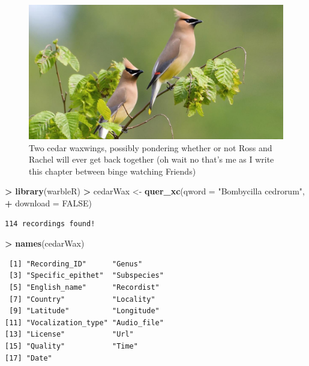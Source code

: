 \documentclass[]{krantz}
\makeatletter
\newenvironment{Shaded}{\begin{snugshade}}{\end{snugshade}}
\newcommand{\KeywordTok}[1]{\textcolor[rgb]{0.27,0.27,0.27}{\textbf{#1}}}
\newcommand{\DataTypeTok}[1]{\textcolor[rgb]{0.27,0.27,0.27}{#1}}
\newcommand{\StringTok}[1]{\textcolor[rgb]{0.5,0.5,0.5}{#1}}
\newcommand{\OtherTok}[1]{\textcolor[rgb]{0.37,0.37,0.37}{#1}}
\newcommand{\OperatorTok}[1]{\textcolor[rgb]{0.43,0.43,0.43}{\textbf{#1}}}
\newcommand{\NormalTok}[1]{#1}
\newenvironment{kframe}{%
\medskip{}
\setlength{\fboxsep}{.8em}
 \def\at@end@of@kframe{}%
 \ifinner\ifhmode%
  \def\at@end@of@kframe{\end{minipage}}%
  \begin{minipage}{\columnwidth}%
 \fi\fi%
 \def\FrameCommand##1{\hskip\@totalleftmargin \hskip-\fboxsep
 \colorbox{shadecolor}{##1}\hskip-\fboxsep
     \hskip-\linewidth \hskip-\@totalleftmargin \hskip\columnwidth}%
 \MakeFramed {\advance\hsize-\width
   \@totalleftmargin\z@ \linewidth\hsize
   \@setminipage}}%
 {\par\unskip\endMakeFramed%
 \at@end@of@kframe}
\renewenvironment{Shaded}{\begin{kframe}}{\end{kframe}}
\makeatother
\begin{document}
\begin{figure}
\includegraphics[width=1\linewidth]{figures/cedarWaxwing} \caption{Two cedar waxwings, possibly pondering whether or not Ross and Rachel will ever get back together (oh wait no that's me as I write this chapter between binge watching Friends)}\label{fig:waxwing}
\end{figure}

\begin{Shaded}
\begin{Highlighting}[]
\OperatorTok{>}\StringTok{ }\KeywordTok{library}\NormalTok{(warbleR)}
\OperatorTok{>}\StringTok{ }\NormalTok{cedarWax <-}\StringTok{ }\KeywordTok{quer_xc}\NormalTok{(}\DataTypeTok{qword =} \StringTok{"Bombycilla cedrorum"}\NormalTok{,}
\OperatorTok{+}\StringTok{                     }\DataTypeTok{download =} \OtherTok{FALSE}\NormalTok{)}
\end{Highlighting}
\end{Shaded}

\begin{verbatim}
114 recordings found!
\end{verbatim}

\begin{Shaded}
\begin{Highlighting}[]
\OperatorTok{>}\StringTok{ }\KeywordTok{names}\NormalTok{(cedarWax)}
\end{Highlighting}
\end{Shaded}

\begin{verbatim}
 [1] "Recording_ID"      "Genus"            
 [3] "Specific_epithet"  "Subspecies"       
 [5] "English_name"      "Recordist"        
 [7] "Country"           "Locality"         
 [9] "Latitude"          "Longitude"        
[11] "Vocalization_type" "Audio_file"       
[13] "License"           "Url"              
[15] "Quality"           "Time"             
[17] "Date"             
\end{verbatim}
\end{document}
